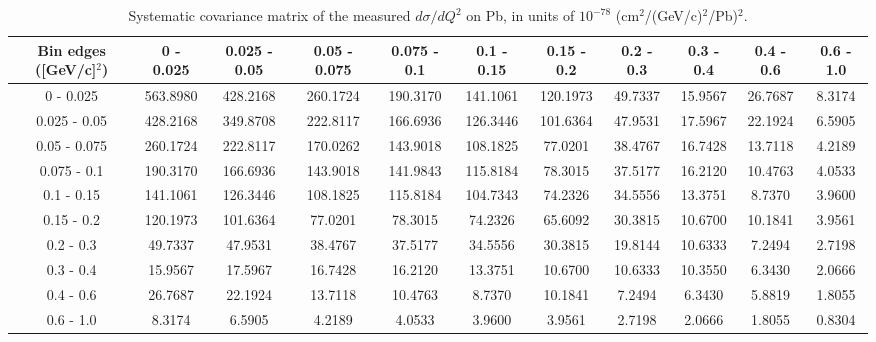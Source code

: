 \documentclass[aps,prl,twocolumn,superscriptaddress,nofootinbib]{revtex4-1}
\begin{document}
\begin{turnpage}
 \begin{table}[h!]
  \centering
  \caption{Systematic covariance matrix of the measured $d\sigma/dQ^{2}$ on Pb, in units of $10^{-78}$ (cm$^{2}$/(GeV/c)$^{2}$/Pb)$^{2}$.}
    \begin{tabular}{c||cccccccccc}
      Bin edges ([GeV/c]$^{2}$) & 0 - 0.025 & 0.025 - 0.05 & 0.05 - 0.075 & 0.075 - 0.1 & 0.1 - 0.15 & 0.15 - 0.2 & 0.2 - 0.3 & 0.3 - 0.4 & 0.4 - 0.6 & 0.6 - 1.0 \\
\hline \hline
         0 - 0.025 & 563.8980 & 428.2168 & 260.1724 & 190.3170 & 141.1061 & 120.1973 & 49.7337 & 15.9567 & 26.7687 &  8.3174 \\
      0.025 - 0.05 & 428.2168 & 349.8708 & 222.8117 & 166.6936 & 126.3446 & 101.6364 & 47.9531 & 17.5967 & 22.1924 &  6.5905 \\
      0.05 - 0.075 & 260.1724 & 222.8117 & 170.0262 & 143.9018 & 108.1825 & 77.0201 & 38.4767 & 16.7428 & 13.7118 &  4.2189 \\
       0.075 - 0.1 & 190.3170 & 166.6936 & 143.9018 & 141.9843 & 115.8184 & 78.3015 & 37.5177 & 16.2120 & 10.4763 &  4.0533 \\
        0.1 - 0.15 & 141.1061 & 126.3446 & 108.1825 & 115.8184 & 104.7343 & 74.2326 & 34.5556 & 13.3751 &  8.7370 &  3.9600 \\
        0.15 - 0.2 & 120.1973 & 101.6364 & 77.0201 & 78.3015 & 74.2326 & 65.6092 & 30.3815 & 10.6700 & 10.1841 &  3.9561 \\
         0.2 - 0.3 & 49.7337 & 47.9531 & 38.4767 & 37.5177 & 34.5556 & 30.3815 & 19.8144 & 10.6333 &  7.2494 &  2.7198 \\
         0.3 - 0.4 & 15.9567 & 17.5967 & 16.7428 & 16.2120 & 13.3751 & 10.6700 & 10.6333 & 10.3550 &  6.3430 &  2.0666 \\
         0.4 - 0.6 & 26.7687 & 22.1924 & 13.7118 & 10.4763 &  8.7370 & 10.1841 &  7.2494 &  6.3430 &  5.8819 &  1.8055 \\
         0.6 - 1.0 &  8.3174 &  6.5905 &  4.2189 &  4.0533 &  3.9600 &  3.9561 &  2.7198 &  2.0666 &  1.8055 &  0.8304 \\
    \end{tabular}
  \label{tablecov:Pb_Systematic_Q2}
 \end{table}
\end{turnpage}
\end{document}
